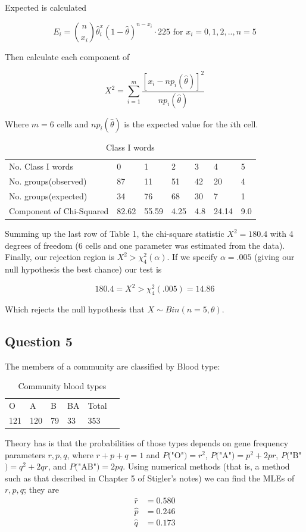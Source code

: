 \documentclass{tufte-book}
\theoremstyle{mytheoremstyle}
\theoremstyle{mylemstyle}
\theoremstyle{mydefstyle}
\begin{document}
Expected is calculated

\[ E_i = \binom{n}{x_i} \hat{\theta}^x_i (1-\hat{\theta})^{n-x_i} \cdot 225 \text{ for } x_i = 0,1,2,..,n=5 \]

Then calculate each component of

\[ X^2 = \sum_{i=1}^m \frac{[x_i - np_i(\hat{\theta})]^2}{np_i(\hat{\theta})}\]

Where $m=6$ cells and $np_i(\hat{\theta})$ is the expected value for the $i$th cell.

\begin{table}
\centering
\begin{tabular}{l|llllll}
No. Class I words & 0 & 1 & 2 & 3 & 4 & 5 \\
No. groups(observed) & 87 & 11 & 51 & 42 & 20 & 4 \\
No. groups(expected) &34&76&68&30&7&1\\
Component of Chi-Squared &82.62&55.59&4.25&4.8&24.14&9.0
\end{tabular}
\caption{Class I words}
\label{millwords}
\end{table}

Summing up the last row of Table 1, the chi-square statistic $X^2=180.4$ with 4 degrees of freedom (6 cells and one parameter was estimated from the data).  Finally, our rejection region is $X^2 > \chi_4^2(\alpha)$.  If we specify $\alpha=.005$ (giving our null hypothesis the best chance) our test is

\[ 180.4 = X^2 > \chi_4^2(.005) = 14.86 \]

Which rejects the null hypothesis that $X \sim Bin(n=5, \theta)$.


\subsection{Question 5}
The members of a community are classified by Blood type:

\begin{table}
\centering
\begin{tabular}{llllll}
O&A&B&BA&Total\\
121&120&79&33&353
\end{tabular}
\caption{Community blood types}
\label{bloodtypes}
\end{table}

Theory has is that the probabilities of those types depends on gene frequency parameters $r,p,q$, where $r+p+q=1$ and $P($"O"$)=r^2$, $P($"A"$)=p^2+2pr$, $P($"B"$)=q^2+2qr$, and $P($"AB"$)=2pq$.  Using numerical methods (that is, a method such as that described in Chapter 5 of Stigler's notes) we can find the MLEs of $r,p,q$; they are
\begin{align*}
\hat{r} &= 0.580 \\
\hat{p} &= 0.246 \\
\hat{q} &= 0.173 \\
\end{align*}
\end{document}
